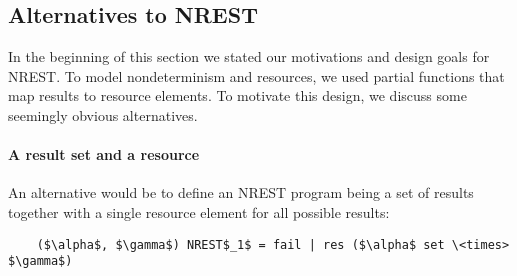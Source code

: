 \documentclass[acmsmall]{acmart}
\newcommand{\is}{\lstinline[language=isabelle]}
\begin{document}









\subsection{Alternatives to NREST}

In the beginning of this section we stated our motivations and design goals for NREST.
To model nondeterminism and resources, we used partial functions that map results to resource elements. To motivate this design, we discuss some seemingly obvious alternatives.


\paragraph{A result set and a resource}
An alternative would be to define an NREST program being a set of results together with a single resource element for all possible results:
\begin{lstlisting}
    ($\alpha$, $\gamma$) NREST$_1$ = fail | res ($\alpha$ set \<times> $\gamma$)
\end{lstlisting}
\end{document}
